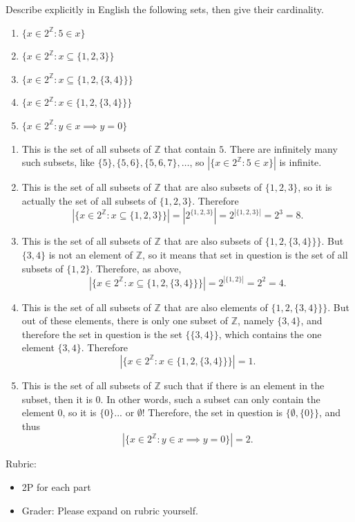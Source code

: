 \documentclass{article}
\newcommand{\Z}{\mathbb{Z}}
\theoremstyle{definition}
\begin{document}
\begin{question}
Describe explicitly in English the following sets, then give their cardinality.

\begin{enumerate}
	\item $\{x \in 2^{\Z} : 5 \in x \}$
	\item $\{x \in 2^{\Z} : x \subseteq \{ 1, 2, 3\} \}$
	\item $\{x \in 2^{\Z} : x \subseteq \{ 1, 2, \{3, 4\} \} \}$
	\item $\{x \in 2^{\Z} : x \in \{ 1, 2, \{3, 4\} \} \}$
	\item $\{x \in 2^{\Z} : y \in x \implies y = 0 \}$
\end{enumerate}
\end{question}
\begin{solution}
\begin{enumerate}
	\item This is the set of all subsets of $\Z$ that contain $5$. There are infinitely many such subsets, like $\{5\}, \{5,6\}, \{5,6, 7\}, \dots$, so $\left | \{x \in 2^{\Z} : 5 \in x \} \right |$ is infinite.
	\item This is the set of all subsets of $\Z$ that are also subsets of $\{1, 2, 3\}$, so it is actually the set of all subsets of $\{1,2,3\}$. Therefore
	\[
	\left |\{x \in 2^{\Z} : x \subseteq \{ 1, 2, 3\} \} \right | = \left | 2^{\{1, 2, 3\}} \right | = 2^{|\{ 1, 2, 3\}|} = 2^3 = 8.
	\]
	
	\item This is the set of all subsets of $\Z$ that are also subsets of $ \{ 1, 2, \{3, 4\} \} \}$. But $\{ 3, 4 \}$ is not an element of $\Z$, so it means that set in question is the set of all subsets of $\{1,2\}$. Therefore, as above, 
	\[
	\left |\{x \in 2^{\Z} : x \subseteq \{ 1, 2, \{3, 4\} \} \} \right | = 2^{|\{1,2 \}|} = 2^2 = 4.
	\]
	
	\item This is the set of all subsets of $\Z$ that are also elements of $ \{ 1, 2, \{3, 4\} \} \}$. But out of these elements, there is only one subset of $\Z$, namely $\{ 3, 4 \}$, and therefore the set in question is the set $\{ \{3,4\} \}$, which contains the one element $\{3,4\}$. Therefore
	\[
	\left | \{x \in 2^{\Z} : x \in \{ 1, 2, \{3, 4\} \} \} \right | = 1.
	\]
	
	\item This is the set of all subsets of $\Z$ such that if there is an element in the subset, then it is $0$. In other words, such a subset can only contain the element $0$, so it is $\{ 0 \}$... or $\emptyset$! Therefore, the set in question is $\{ \emptyset, \{0\}\}$, and thus
	\[
	\left | \{x \in 2^{\Z} : y \in x \implies y = 0 \} \right | = 2.
	\]
\end{enumerate}
{\color{red} Rubric:
\begin{itemize}
\item 2P for each part
\item Grader: Please expand on rubric yourself.
\end{itemize}}
\end{solution}
\end{document}
